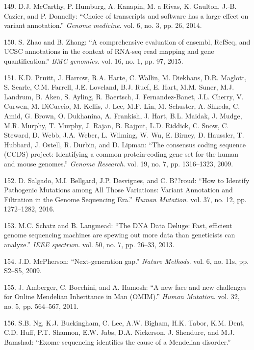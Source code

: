 \documentclass[12pt,twoside]{reedthesis}
\theoremstyle{definition}
\theoremstyle{definition}
\theoremstyle{remark}
\begin{document}
  \hypertarget{ref-McCarthy2014}{}
  149. D.J. McCarthy, P. Humburg, A. Kanapin, M. a Rivas, K. Gaulton,
  J.-B. Cazier, and P. Donnelly: ``Choice of transcripts and software has
  a large effect on variant annotation.'' \emph{Genome medicine}. vol. 6,
  no. 3, pp. 26, 2014.
  
  \hypertarget{ref-Zhao2015}{}
  150. S. Zhao and B. Zhang: ``A comprehensive evaluation of ensembl,
  RefSeq, and UCSC annotations in the context of RNA-seq read mapping and
  gene quantification.'' \emph{BMC genomics}. vol. 16, no. 1, pp. 97,
  2015.
  
  \hypertarget{ref-Pruitt2009}{}
  151. K.D. Pruitt, J. Harrow, R.A. Harte, C. Wallin, M. Diekhans, D.R.
  Maglott, S. Searle, C.M. Farrell, J.E. Loveland, B.J. Ruef, E. Hart,
  M.M. Suner, M.J. Landrum, B. Aken, S. Ayling, R. Baertsch, J.
  Fernandez-Banet, J.L. Cherry, V. Curwen, M. DiCuccio, M. Kellis, J. Lee,
  M.F. Lin, M. Schuster, A. Shkeda, C. Amid, G. Brown, O. Dukhanina, A.
  Frankish, J. Hart, B.L. Maidak, J. Mudge, M.R. Murphy, T. Murphy, J.
  Rajan, B. Rajput, L.D. Riddick, C. Snow, C. Steward, D. Webb, J.A.
  Weber, L. Wilming, W. Wu, E. Birney, D. Haussler, T. Hubbard, J. Ostell,
  R. Durbin, and D. Lipman: ``The consensus coding sequence (CCDS)
  project: Identifying a common protein-coding gene set for the human and
  mouse genomes.'' \emph{Genome Research}. vol. 19, no. 7, pp. 1316--1323,
  2009.
  
  \hypertarget{ref-Salgado2016}{}
  152. D. Salgado, M.I. Bellgard, J.P. Desvignes, and C. B??roud: ``How to
  Identify Pathogenic Mutations among All Those Variations: Variant
  Annotation and Filtration in the Genome Sequencing Era.'' \emph{Human
  Mutation}. vol. 37, no. 12, pp. 1272--1282, 2016.
  
  \hypertarget{ref-Schatz2013}{}
  153. M.C. Schatz and B. Langmead: ``The DNA Data Deluge: Fast, efficient
  genome sequencing machines are spewing out more data than geneticists
  can analyze.'' \emph{IEEE spectrum}. vol. 50, no. 7, pp. 26--33, 2013.
  
  \hypertarget{ref-McPherson2009}{}
  154. J.D. McPherson: ``Next-generation gap.'' \emph{Nature Methods}.
  vol. 6, no. 11s, pp. S2--S5, 2009.
  
  \hypertarget{ref-Amberger2011}{}
  155. J. Amberger, C. Bocchini, and A. Hamosh: ``A new face and new
  challenges for Online Mendelian Inheritance in Man (OMIM).'' \emph{Human
  Mutation}. vol. 32, no. 5, pp. 564--567, 2011.
  
  \hypertarget{ref-Ng}{}
  156. S.B. Ng, K.J. Buckingham, C. Lee, A.W. Bigham, H.K. Tabor, K.M.
  Dent, C.D. Huff, P.T. Shannon, E.W. Jabs, D.A. Nickerson, J. Shendure,
  and M.J. Bamshad: ``Exome sequencing identifies the cause of a Mendelian
  disorder.''
  
\end{document}
